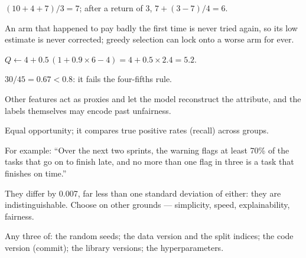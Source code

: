 \begin{ans}
  \item $(10 + 4 + 7)/3 = 7$; after a return of 3, $7 + (3 - 7)/4 = 6$.
  \item An arm that happened to pay badly the first time is never tried again, so its
        low estimate is never corrected; greedy selection can lock onto a worse arm for
        ever.
  \item $Q \leftarrow 4 + 0.5\,(1 + 0.9 \times 6 - 4) = 4 + 0.5 \times 2.4 = 5.2$.
\end{ans}

\begin{ans}
  \item $30/45 = 0.67 < 0.8$: it fails the four-fifths rule.
  \item Other features act as proxies and let the model reconstruct the attribute, and
        the labels themselves may encode past unfairness.
  \item Equal opportunity; it compares true positive rates (recall) across groups.
\end{ans}

\begin{ans}
  \item For example: ``Over the next two sprints, the warning flags at least 70\% of
        the tasks that go on to finish late, and no more than one flag in three is a
        task that finishes on time.''
  \item They differ by 0.007, far less than one standard deviation of either: they are
        indistinguishable. Choose on other grounds --- simplicity, speed,
        explainability, fairness.
  \item Any three of: the random seeds; the data version and the split indices; the
        code version (commit); the library versions; the hyperparameters.
\end{ans}
